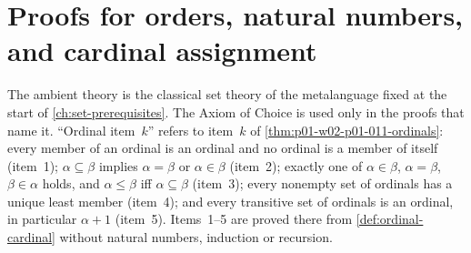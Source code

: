 \section{Proofs for orders, natural numbers, and cardinal assignment}
\label{sec:annex-p01-w02-p01-008}

The ambient theory is the classical set theory of the metalanguage fixed at
the start of \cref{ch:set-prerequisites}. The Axiom of Choice is used only in
the proofs that name it. ``Ordinal item~\(k\)'' refers to item~\(k\) of
\cref{thm:p01-w02-p01-011-ordinals}: every member of an ordinal is an
ordinal and no ordinal is a member of itself (item~1); \(\alpha\subseteq\beta\)
implies \(\alpha=\beta\) or \(\alpha\in\beta\) (item~2); exactly one of
\(\alpha\in\beta\), \(\alpha=\beta\), \(\beta\in\alpha\) holds, and
\(\alpha\leq\beta\) iff \(\alpha\subseteq\beta\) (item~3); every nonempty set
of ordinals has a unique least member (item~4); and every transitive set of
ordinals is an ordinal, in particular \(\alpha+1\) (item~5). Items~1--5 are
proved there from \cref{def:ordinal-cardinal} without natural numbers,
induction or recursion.

